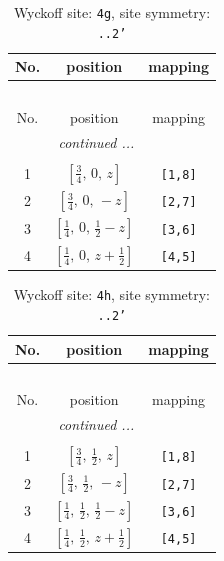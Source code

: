 \documentclass[fleqn,8pt]{jsarticle}
\begin{document}
\renewcommand{\arraystretch}{1.2}
\begin{longtable}{ccc}
\caption{Wyckoff site: {\tt 4g}, site symmetry: {\tt ..2'}}
 \\
 \hline \hline
No. & position & mapping \\ \hline \endfirsthead

\multicolumn{2}{l}{\tablename\ \thetable{}} \\
 \hline \hline
No. & position & mapping \\ \hline \endhead

 \hline \hline
\multicolumn{2}{r}{\footnotesize\it continued ...} \\ \endfoot

 \hline \hline
\multicolumn{2}{r}{} \\ \endlastfoot

1 & $\left[ \frac{3}{4},\, 0,\, z \right]$ & {\tt [1,8]} \\ \hline
2 & $\left[ \frac{3}{4},\, 0,\, - z \right]$ & {\tt [2,7]} \\ \hline
3 & $\left[ \frac{1}{4},\, 0,\, \frac{1}{2} - z \right]$ & {\tt [3,6]} \\ \hline
4 & $\left[ \frac{1}{4},\, 0,\, z + \frac{1}{2} \right]$ & {\tt [4,5]} \\
\end{longtable}
\renewcommand{\arraystretch}{1.2}
\begin{longtable}{ccc}
\caption{Wyckoff site: {\tt 4h}, site symmetry: {\tt ..2'}}
 \\
 \hline \hline
No. & position & mapping \\ \hline \endfirsthead

\multicolumn{2}{l}{\tablename\ \thetable{}} \\
 \hline \hline
No. & position & mapping \\ \hline \endhead

 \hline \hline
\multicolumn{2}{r}{\footnotesize\it continued ...} \\ \endfoot

 \hline \hline
\multicolumn{2}{r}{} \\ \endlastfoot

1 & $\left[ \frac{3}{4},\, \frac{1}{2},\, z \right]$ & {\tt [1,8]} \\ \hline
2 & $\left[ \frac{3}{4},\, \frac{1}{2},\, - z \right]$ & {\tt [2,7]} \\ \hline
3 & $\left[ \frac{1}{4},\, \frac{1}{2},\, \frac{1}{2} - z \right]$ & {\tt [3,6]} \\ \hline
4 & $\left[ \frac{1}{4},\, \frac{1}{2},\, z + \frac{1}{2} \right]$ & {\tt [4,5]} \\
\end{longtable}
\end{document}
